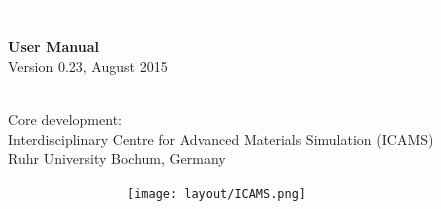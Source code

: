 
\begin{titlepage}
\BgThispage
{}
\vspace*{0.3\textheight}
\noindent
\textcolor{white}{\fontsize{60}{70}}\\

\textcolor{white}{\Large\textbf{An open-source phase-field library}}
\vspace*{2cm}\par
\noindent
\vfill
\begin{minipage}{0.5\linewidth}
    \Huge \textbf{User Manual}\\
    \large Version 0.23, August 2015
\end{minipage}

\begin{minipage}{0.9\textwidth}
~\\
Core development:\\
Interdisciplinary Centre for Advanced Materials Simulation (ICAMS)\\
Ruhr University Bochum, Germany
\end{minipage}
\begin{minipage}{0.3\textwidth}
        ~~~~~~~~~~~~~~~~~\texttt{[image: layout/ICAMS.png]}
\end{minipage}
\end{titlepage}
\restoregeometry

